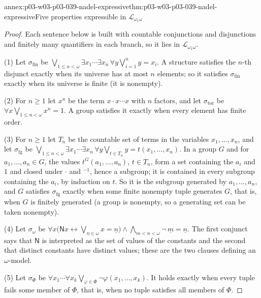 \begin{annexitem}{annex:p03-w03-p03-039-nadel-expressive}{thm:p03-w03-p03-039-nadel-expressive}{Five properties expressible in \(\mathscr L_{\omega_1\omega}\)}
\begin{proof}
Each sentence below is built with countable conjunctions and disjunctions
and finitely many quantifiers in each branch, so it lies in
\(\mathscr L_{\omega_1\omega}\).

(1) Let \(\sigma_{\mathrm{fin}}\) be
\(\bigvee_{1\le n<\omega}\exists x_1\cdots\exists x_n\,\forall y\bigvee_{i=1}^{n}y=x_i\).
A structure satisfies the \(n\)-th disjunct exactly when its universe has at
most \(n\) elements; so it satisfies \(\sigma_{\mathrm{fin}}\) exactly when
its universe is finite (it is nonempty).

(2) For \(n\ge1\) let \(x^n\) be the term \(x\cdot x\cdots x\) with \(n\)
factors, and let \(\sigma_{\mathrm{tor}}\) be
\(\forall x\bigvee_{1\le n<\omega}x^n=1\). A group satisfies it exactly when
every element has finite order.

(3) For \(n\ge1\) let \(T_n\) be the countable set of terms in the variables
\(x_1,\dots,x_n\), and let \(\sigma_{\mathrm{fg}}\) be
\(\bigvee_{1\le n<\omega}\exists x_1\cdots\exists x_n\,\forall y\bigvee_{t\in T_n}y=t(x_1,\dots,x_n)\).
In a group \(G\) and for \(a_1,\dots,a_n\in G\), the values
\(t^G(a_1,\dots,a_n)\), \(t\in T_n\), form a set containing the \(a_i\) and
\(1\) and closed under \(\cdot\) and \({}^{-1}\), hence a subgroup; it is
contained in every subgroup containing the \(a_i\), by induction on \(t\).
So it is the subgroup generated by \(a_1,\dots,a_n\), and \(G\) satisfies
\(\sigma_{\mathrm{fg}}\) exactly when some finite nonempty tuple generates
\(G\), that is, when \(G\) is finitely generated (a group is nonempty, so a
generating set can be taken nonempty).

(4) Let \(\sigma_\omega\) be
\(\forall x\bigl(\mathsf Nx\leftrightarrow\bigvee_{n\in\omega}x=\underline n\bigr)\wedge\bigwedge_{m<n<\omega}\neg\,\underline m=\underline n\).
The first conjunct says that \(\mathsf N\) is interpreted as the set of
values of the constants and the second that distinct constants have
distinct values; these are the two clauses defining an \(\omega\)-model.

(5) Let \(\sigma_\Phi\) be
\(\forall x_1\cdots\forall x_k\bigvee_{\varphi\in\Phi}\neg\varphi(x_1,\dots,x_k)\).
It holds exactly when every tuple fails some member of \(\Phi\), that is, when
no tuple satisfies all members of \(\Phi\).
\end{proof}
\end{annexitem}

